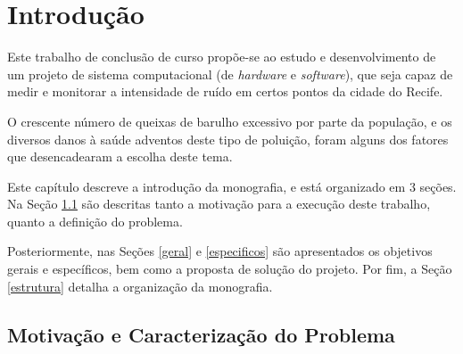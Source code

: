 \documentclass[
    12pt,               %
    openright,          %
    oneside,
    a4paper,            
    english,            %
    brazil              %
    ]{abntex2}
\begin{document}

\tableofcontents*
\cleardoublepage

\textual

\chapter{Introdução}\label{introducao}

Este trabalho de conclusão de curso propõe-se ao estudo e desenvolvimento de um projeto de sistema computacional (de \textit{hardware} e \textit{software}), que seja capaz de medir e monitorar a intensidade de ruído em certos pontos da cidade do Recife.

O crescente número de queixas de barulho excessivo por parte da população, e os diversos danos à saúde adventos deste tipo de poluição, foram alguns dos fatores que desencadearam a escolha deste tema.

Este capítulo descreve a introdução da monografia, e está organizado em 3 seções. Na Seção \ref{motivacao} são descritas tanto a motivação para a execução deste trabalho, quanto a definição do problema. 

Posteriormente, nas Seções \ref{geral} e \ref{especificos} são apresentados os objetivos gerais e específicos, bem como a proposta de solução do projeto. Por fim, a Seção \ref{estrutura} detalha a organização da monografia.

\section{Motivação e Caracterização do Problema}\label{motivacao}
\end{document}
